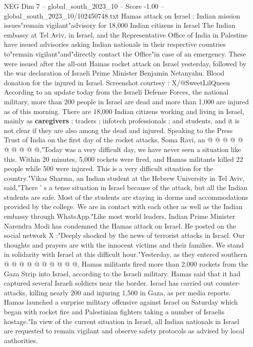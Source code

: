\begin{textsample}{NEG Dim 7 – global\_south\_2023\_10 – Score -1.00 – global\_south\_2023\_10/102450748.txt}  \label{ex:f7_neg_065}
Hamas attack on Israel : Indian mission issues"remain vigilant"advisory for 18,000 Indian citizens in Israel The Indian embassy at Tel Aviv, in Israel, and the Representative Office of India in Palestine have issued advisories asking Indian nationals in their respective countries to"remain vigilant"and"directly contact the Office"in case of an emergency.
These were issued after the all-out Hamas rocket attack on Israel yesterday, followed by the war declaration of Israeli Prime Minister Benjamin Netanyahu.
Blood donation for the injured in Israel.
Screenshot courtesy : X/@SweetLilQueen According to an update today from the Israeli Defense Forces, the national military, more than 200 people in Israel are dead and more than 1,000 are injured as of this morning.
There are 18,000 Indian citizens working and living in Israel, mainly as \textbf{caregivers} ; traders ; infotech professionals ; and students, and it is not clear if they are also among the dead and injured.
Speaking to the Press Trust of India on the first day of the rocket attacks, Soma Ravi, an @ @ @ @ @ @ @ @ @ @,"Today was a very difficult day, we have never seen a situation like this.
Within 20 minutes, 5,000 rockets were fired, and Hamas militants killed 22 people while 500 were injured.
This is a very difficult situation for the country."Vikas Sharma, an Indian student at the Hebrew University in Tel Aviv, said,"There ' s a tense situation in Israel because of the attack, but all the Indian students are safe.
Most of the students are staying in dorms and accommodations provided by the college.
We are in contact with each other as well as the Indian embassy through WhatsApp."Like most world leaders, Indian Prime Minister Narendra Modi has condemned the Hamas attack on Israel.
He posted on the social network X :"Deeply shocked by the news of terrorist attacks in Israel.
Our thoughts and prayers are with the innocent victims and their families.
We stand in solidarity with Israel at this difficult hour."Yesterday, as they entered southern @ @ @ @ @ @ @ @ @ @, Hamas militants fired more than 2,000 rockets from the Gaza Strip into Israel, according to the Israeli military.
Hamas said that it had captured several Israeli soldiers near the border.
Israel has carried out counter-attacks, killing nearly 200 and injuring 1,500 in Gaza, as per media reports.
Hamas launched a surprise military offensive against Israel on Saturday which began with rocket fire and Palestinian fighters taking a number of Israelis hostage."In view of the current situation in Israel, all Indian nationals in Israel are requested to remain vigilant and observe safety protocols as advised by local authorities.

\end{textsample}
